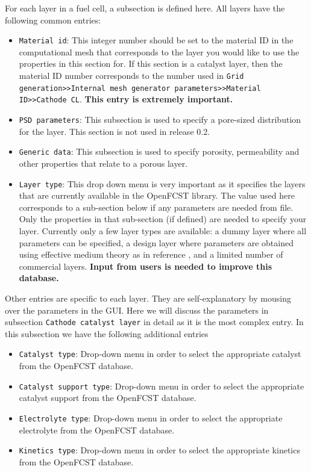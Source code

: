 For each layer in a fuel cell, a subsection is defined here. All layers have the following common entries:
\begin{itemize}
 \item \texttt{Material id}: This integer number should be set to the material ID in the computational mesh that corresponds to the layer you would like to use the properties in this section for. If this section is a catalyst layer, then the material ID number corresponds to the number used in \texttt{Grid generation>>Internal mesh generator parameters>>Material ID>>Cathode CL}. \textbf{This entry is extremely important.}
 \item \texttt{PSD parameters}: This subsection is used to specify a pore-sized distribution for the layer. This section is not used in release 0.2.
 \item \texttt{Generic data}: This subsection is used to specify porosity, permeability and other properties that relate to a porous layer.
 \item \texttt{Layer type}: This drop down menu is very important as it specifies the layers that are currently available in the OpenFCST library. The value used here corresponds to a sub-section below if any parameters are needed from file. Only the properties in that sub-section (if defined) are needed to specify your layer. Currently only a few layer types are available: a dummy layer where all parameters can be specified, a design layer where parameters are obtained using effective medium theory as in reference \cite{Secanell07b}, and a limited number of commercial layers. \textbf{Input from users is needed to improve this database.}
\end{itemize}
Other entries are specific to each layer. They are self-explanatory by mousing over the parameters in the GUI. Here we will discuss the parameters in subsection \texttt{Cathode catalyst layer} in detail as it is the most complex entry. In this subsection we have the following additional entries
\begin{itemize}
 \item \texttt{Catalyst type}: Drop-down menu in order to select the appropriate catalyst from the OpenFCST database.
 \item \texttt{Catalyst support type}: Drop-down menu in order to select the appropriate catalyst support from the OpenFCST database.
 \item \texttt{Electrolyte type}: Drop-down menu in order to select the appropriate electrolyte from the OpenFCST database.
 \item \texttt{Kinetics type}: Drop-down menu in order to select the appropriate kinetics from the OpenFCST database.
\end{itemize}
